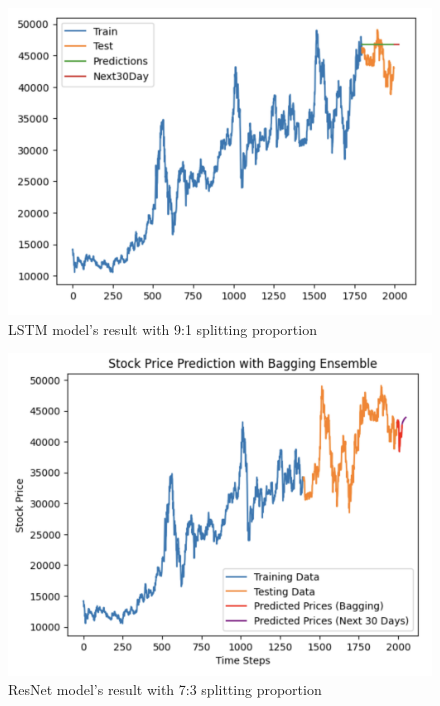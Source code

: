 \documentclass{ieeeojies}
\begin{document}
\begin{figure}[H]
  \centering
  \begin{minipage}{0.8\linewidth}
    \centering
        \includegraphics[width=\linewidth]{bibliography/ETS_BIDV91.png}
    \caption{LSTM model's result with 9:1 splitting proportion}
    \label{fig28}
  \end{minipage}
\end{figure}
\begin{figure}[H]
  \centering
  \begin{minipage}{0.8\linewidth}
    \centering
        \includegraphics[width=\linewidth]{bibliography/baggingGRU_BIDV.png}
    \caption{ResNet model's result with 7:3 splitting proportion}
    \label{fig28}
  \end{minipage}
\end{figure}
\end{document}
